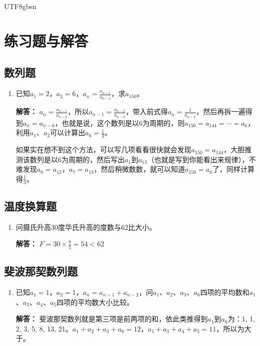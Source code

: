 \documentclass[12pt]{article}
\begin{document}
\begin{CJK*}{UTF8}{gbsn}
\section{练习题与解答}

\subsection{数列题}
\begin{enumerate}
    \item 已知$a_1 = 2$，$a_2 = 6$，$a_n = \frac{a_{n-1}}{a_{n-2}}$，求$a_{150}$。
    
    \textbf{解答：} $a_n = \frac{a_{n-1}}{a_{n-2}}$，所以$a_{n-1} = \frac{a_{n-2}}{a_{n-3}}$，带入前式得$a_n = \frac{1}{a_{n-3}}$，然后再拆一遍得到$a_n = a_{n-6}$，也就是说，这个数列是以6为周期的，则$a_{150} = a_{144} = \cdots = a_6$，利用$a_1$、$a_2$可以计算出$a_6 = \frac{1}{3}$。
    
    如果实在想不到这个方法，可以写几项看看很快就会发现$a_{150} = a_{144}$，大胆推测该数列是以6为周期的，然后写出$a_1$到$a_{13}$（也就是写到你能看出来规律），不难发现$a_6 = a_{12}$，$a_7 = a_{13}$，然后稍微数数，就可以知道$a_{150} = a_6$了，同样计算得$\frac{1}{3}$。
\end{enumerate}

\subsection{温度换算题}
\begin{enumerate}
    \item 问摄氏升高30度华氏升高的度数与62比大小。
    
    \textbf{解答：} $F = 30 \times \frac{9}{5} = 54 < 62$
\end{enumerate}

\subsection{斐波那契数列题}
\begin{enumerate}
    \item 已知$a_1 = 1$，$a_2 = 1$，$a_n = a_{n-1} + a_{n-2}$，问$a_1$、$a_2$、$a_3$、$a_6$四项的平均数和$a_1$、$a_3$、$a_4$、$a_5$四项的平均数大小比较。
    
    \textbf{解答：} 斐波那契数列就是第三项是前两项的和，依此类推得到$a_1$到$a_6$为：1, 1, 2, 3, 5, 8, 13, 21。$a_1 + a_2 + a_3 + a_6 = 12$，$a_1 + a_3 + a_4 + a_5 = 11$，所以为大于。
\end{enumerate}


\end{CJK*}
\end{document}
